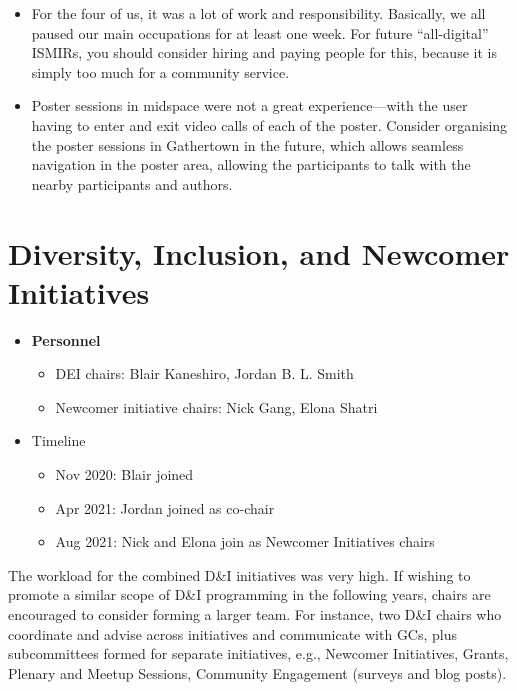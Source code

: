 \documentclass[%
10pt,								%
titlepage,						%
]
{scrartcl}
\begin{document}
\begin{itemize}
    \item For the four of us, it was a lot of work and responsibility. Basically, we all paused our main occupations for at least one week. For future ``all-digital'' ISMIRs, you should consider hiring and paying people for this, because it is simply too much for a community service.
    \item Poster sessions in midspace were not a great experience---with the user having to enter and exit video calls of each of the poster. Consider organising the poster sessions in Gathertown in the future, which allows seamless navigation in the poster area, allowing the participants to talk with the nearby participants and authors.
\end{itemize}

\section{Diversity, Inclusion, and Newcomer Initiatives}
    \begin{itemize}
        \item \textbf{Personnel}
            \begin{itemize}
                \item   DEI chairs: Blair Kaneshiro, Jordan B. L. Smith
                \item   Newcomer initiative chairs: Nick Gang, Elona Shatri
            \end{itemize}
        \item   Timeline
            \begin{itemize}
                \item   Nov 2020: Blair joined 
                \item   Apr 2021: Jordan joined as co-chair
                \item   Aug 2021: Nick and Elona join as Newcomer Initiatives chairs
            \end{itemize}
    \end{itemize}
    
    The workload for the combined D\&I initiatives was very high. If wishing to promote a similar scope of D\&I programming in the following years, chairs are encouraged to consider forming a larger team. For instance, two D\&I chairs who coordinate and advise across initiatives and communicate with GCs, plus subcommittees formed for separate initiatives, e.g., Newcomer Initiatives, Grants, Plenary and Meetup Sessions, Community Engagement (surveys and blog posts).
\end{document}
